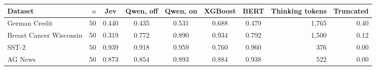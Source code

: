\begin{tabular}{lrcccccrr}
\toprule
Dataset & $n$ & Jev & Qwen, off & Qwen, on & XGBoost & BERT & Thinking tokens & Truncated \\
\midrule
German Credit & 50 & 0.440 & 0.435 & 0.531 & 0.688 & 0.479 & 1{,}765 & 0.40 \\
Breast Cancer Wisconsin & 50 & 0.319 & 0.772 & 0.890 & 0.934 & 0.792 & 1{,}500 & 0.12 \\
SST-2 & 50 & 0.939 & 0.918 & 0.959 & 0.760 & 0.960 & 376 & 0.00 \\
AG News & 50 & 0.873 & 0.854 & 0.893 & 0.884 & 0.938 & 522 & 0.00 \\
\bottomrule
\end{tabular}
